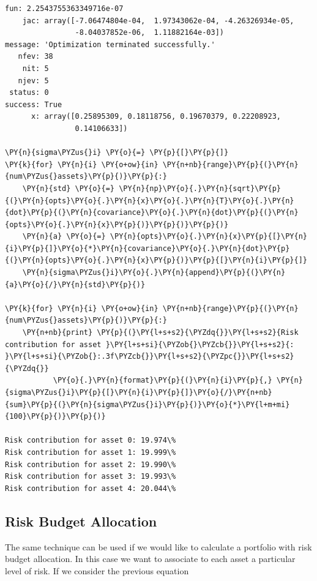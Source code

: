 \begin{tcolorbox}[breakable, size=fbox, boxrule=1pt, pad at break*=1mm,colback=cellbackground, colframe=cellborder]
\begin{Verbatim}[commandchars=\\\{\}]
    fun: 2.2543755363349716e-07
    jac: array([-7.06474804e-04,  1.97343062e-04, -4.26326934e-05,
                -8.04037852e-06,  1.11882164e-03])
message: 'Optimization terminated successfully.'
   nfev: 38
    nit: 5 
   njev: 5
 status: 0
success: True
      x: array([0.25895309, 0.18118756, 0.19670379, 0.22208923, 
                0.14106633])

\PY{n}{sigma\PYZus{}i} \PY{o}{=} \PY{p}{[}\PY{p}{]}
\PY{k}{for} \PY{n}{i} \PY{o+ow}{in} \PY{n+nb}{range}\PY{p}{(}\PY{n}{num\PYZus{}assets}\PY{p}{)}\PY{p}{:}
    \PY{n}{std} \PY{o}{=} \PY{n}{np}\PY{o}{.}\PY{n}{sqrt}\PY{p}{(}\PY{n}{opts}\PY{o}{.}\PY{n}{x}\PY{o}{.}\PY{n}{T}\PY{o}{.}\PY{n}{dot}\PY{p}{(}\PY{n}{covariance}\PY{o}{.}\PY{n}{dot}\PY{p}{(}\PY{n}{opts}\PY{o}{.}\PY{n}{x}\PY{p}{)}\PY{p}{)}\PY{p}{)} 
    \PY{n}{a} \PY{o}{=} \PY{n}{opts}\PY{o}{.}\PY{n}{x}\PY{p}{[}\PY{n}{i}\PY{p}{]}\PY{o}{*}\PY{n}{covariance}\PY{o}{.}\PY{n}{dot}\PY{p}{(}\PY{n}{opts}\PY{o}{.}\PY{n}{x}\PY{p}{)}\PY{p}{[}\PY{n}{i}\PY{p}{]} 
    \PY{n}{sigma\PYZus{}i}\PY{o}{.}\PY{n}{append}\PY{p}{(}\PY{n}{a}\PY{o}{/}\PY{n}{std}\PY{p}{)}
		
\PY{k}{for} \PY{n}{i} \PY{o+ow}{in} \PY{n+nb}{range}\PY{p}{(}\PY{n}{num\PYZus{}assets}\PY{p}{)}\PY{p}{:}
    \PY{n+nb}{print} \PY{p}{(}\PY{l+s+s2}{\PYZdq{}}\PY{l+s+s2}{Risk contribution for asset }\PY{l+s+si}{\PYZob{}\PYZcb{}}\PY{l+s+s2}{: }\PY{l+s+si}{\PYZob{}:.3f\PYZcb{}}\PY{l+s+s2}{\PYZpc{}}\PY{l+s+s2}{\PYZdq{}}
           \PY{o}{.}\PY{n}{format}\PY{p}{(}\PY{n}{i}\PY{p}{,} \PY{n}{sigma\PYZus{}i}\PY{p}{[}\PY{n}{i}\PY{p}{]}\PY{o}{/}\PY{n+nb}{sum}\PY{p}{(}\PY{n}{sigma\PYZus{}i}\PY{p}{)}\PY{o}{*}\PY{l+m+mi}{100}\PY{p}{)}\PY{p}{)}

Risk contribution for asset 0: 19.974\%
Risk contribution for asset 1: 19.999\%
Risk contribution for asset 2: 19.990\%
Risk contribution for asset 3: 19.993\%
Risk contribution for asset 4: 20.044\%
\end{Verbatim}
\end{tcolorbox}


\subsection{Risk Budget Allocation}
\label{risk-budget-allocation}

The same technique can be used if we would like to calculate a portfolio
with risk budget allocation. In this case we want to associate to each asset a particular level of risk. If we consider the previous equation

